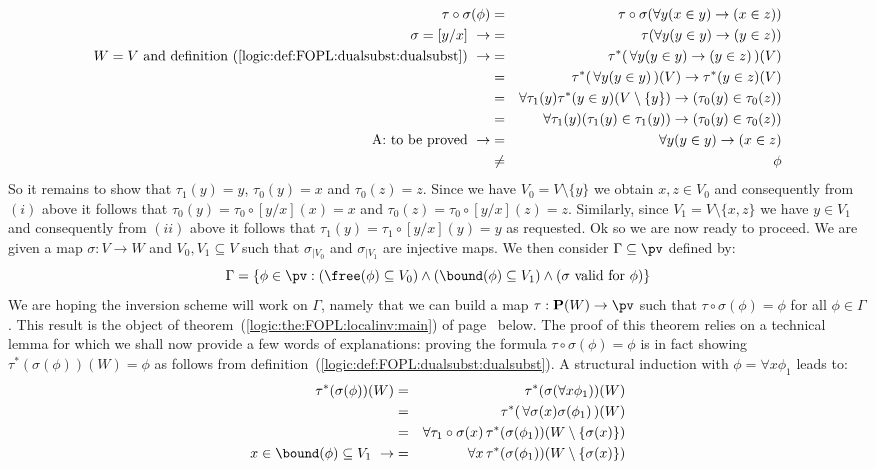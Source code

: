     \begin{eqnarray*}
    \tau\circ\sigma(\phi)&=&\tau\circ\sigma(\forall y(x\in y)\to(x\in
    z))\\
    \sigma=[y/x]\ \rightarrow&=&\tau(\forall y(y\in y)\to(y\in z))\\
    \mbox{$W=V$ and definition~(\ref{logic:def:FOPL:dualsubst:dualsubst})}\
    \rightarrow
    &=&\tau^{*}(\,\forall y(y\in y)\to(y\in z)\,)(V)\\
    &=&\tau^{*}(\,\forall y(y\in y)\,)(V)\to\tau^{*}(y\in z)(V)\\
    &=&\forall \tau_{1}(y)\tau^{*}(y\in
    y)(V\setminus\{y\})\to(\tau_{0}(y)\in\tau_{0}(z))\\
    &=&\forall\tau_{1}(y)(\tau_{1}(y)\in
    \tau_{1}(y))\to(\tau_{0}(y)\in\tau_{0}(z))\\
    \mbox{A: to be proved}\ \rightarrow&=&\forall y(y\in y)\to(x\in z)\\
    &\neq&\phi
    \end{eqnarray*}
So it remains to show that $\tau_{1}(y)=y$, $\tau_{0}(y)=x$ and
$\tau_{0}(z)=z$. Since we have $V_{0}=V\setminus\{y\}$ we obtain
$x,z\in V_{0}$ and consequently from $(i)$ above it follows that
$\tau_{0}(y)=\tau_{0}\circ[y/x](x)=x$ and
$\tau_{0}(z)=\tau_{0}\circ[y/x](z)=z$. Similarly, since
$V_{1}=V\setminus\{x,z\}$ we have $y\in V_{1}$ and consequently from
$(ii)$ above it follows that $\tau_{1}(y)=\tau_{1}\circ[y/x](y)=y$
as requested. Ok so we are now ready to proceed. We are given a map
$\sigma:V\to W$ and $V_{0}, V_{1}\subseteq V$ such that
$\sigma_{|V_{0}}$ and $\sigma_{|V_{1}}$ are injective maps. We then
consider $\Gamma\subseteq\pv$ defined by:
    \[
    \Gamma=\{\phi\in\pv:(\free(\phi)\subseteq
    V_{0})\land(\bound(\phi)\subseteq V_{1})\land(\mbox{$\sigma$
    valid for $\phi$})\}
    \]
We are hoping the inversion scheme will work on $\Gamma$, namely
that we can build a map $\tau:{\bf P}(W)\to\pv$ such that
$\tau\circ\sigma(\phi)=\phi$ for all $\phi\in\Gamma$. This result is
the object of theorem~(\ref{logic:the:FOPL:localinv:main}) of
page~\pageref{logic:the:FOPL:localinv:main} below. The proof of this
theorem relies on a technical lemma for which we shall now provide a
few words of explanations: proving the formula
$\tau\circ\sigma(\phi)=\phi$ is in fact showing
$\tau^{*}(\sigma(\phi))(W)=\phi$ as follows from
definition~(\ref{logic:def:FOPL:dualsubst:dualsubst}). A structural
induction with $\phi=\forall x\phi_{1}$ leads to:
    \begin{eqnarray*}
    \tau^{*}(\sigma(\phi))(W)&=&\tau^{*}(\sigma(\forall
    x\phi_{1}))(W)\\
    &=&\tau^{*}(\,\forall
    \sigma(x)\sigma(\phi_{1})\,)(W)\\
    &=&\forall
    \tau_{1}\circ\sigma(x)\,\tau^{*}(\sigma(\phi_{1}))(W\setminus\{\sigma(x)\})\\
    x\in\bound(\phi)\subseteq V_{1}\ \rightarrow
    &=&\forall x\,\tau^{*}(\sigma(\phi_{1}))(W\setminus\{\sigma(x)\})
    \end{eqnarray*}
